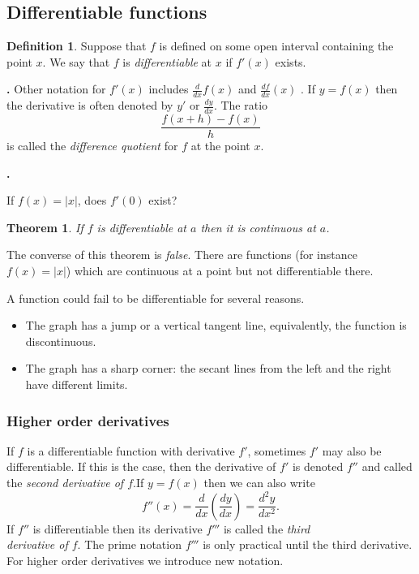 \documentclass[t]{beamer}
\theoremstyle{plain}
\newtheorem{thm}[prop]{Theorem}
\theoremstyle{definition}
\newtheorem{dfn}{Definition}
\newcounter{heading}
\newcommand{\newhead}[1]{\medskip\stepcounter{heading}\noindent\textbf{\hspace{0.2cm}{#1}.}}
\begin{document}
\subsection{Differentiable functions}
\begin{frame}
\begin{dfn} Suppose that $f$ is defined on some open interval containing the point $x$. We say that $f$ is \textit{differentiable} at $x$ if $f'(x)$ exists.\end{dfn}\pause

\newhead{Remark on notation} Other notation for $f'(x)$  includes $\frac{d}{dx}f(x)$ and $\frac{df}{dx}(x)$ . If $y=f(x)$ then the derivative is often denoted by $y'$ or $\frac{dy}{dx}$. The ratio
\[\frac{f(x+h)-f(x)}{h}\]
is called the \textit{difference quotient} for $f$ at the point $x$.\pause

\vspace*{.1cm}

\newhead{Example}

\noindent If $f(x) = |x|$, does $f'(0)$ exist?

\end{frame}

\begin{frame}
\begin{thm}
If $f$ is differentiable at $a$ then it is continuous at $a$. \end{thm}\pause

\vspace*{.4cm}

\noindent The converse of this theorem is \emph{false}.  There are functions (for instance $f(x) = |x|$) which are continuous at a point but not differentiable there.\pause

\noindent A function could fail to be differentiable for several reasons.   \pause
\begin{itemize}
\item The graph has a jump or a vertical tangent line, equivalently, the function is discontinuous. \pause
\item The graph has a sharp corner: the secant lines from the left and the right have different limits.
\end{itemize}

\end{frame}

\begin{frame}
\frametitle{Higher order derivatives}

\noindent If $f$ is a differentiable function with derivative $f'$, sometimes $f'$ may also be differentiable. If this is the case, then the derivative of $f'$ is denoted $f''$ and called the \textit{second derivative of $f$}.\pause If $y=f(x)$ then we can also write
\[f''(x)=\frac{d}{dx}\left(\frac{dy}{dx}\right)=\frac{d^2y}{dx^2}.\]\pause
If $f''$ is differentiable then its derivative $f'''$ is called the \textit{third\\ derivative of $f$}. The prime notation $f'''$ is only practical until the third derivative. For higher order derivatives we introduce new notation.
\end{frame}
\end{document}
